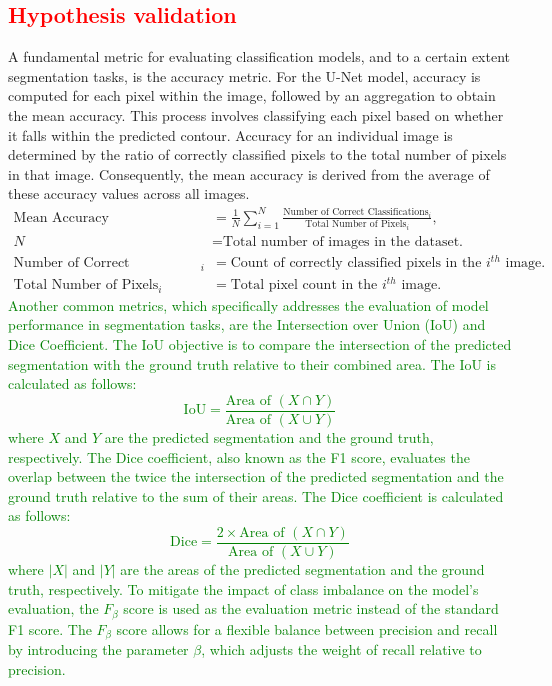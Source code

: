 \documentclass[preprint,12pt]{elsarticle}
\begin{document}
\subsection{\textcolor{red}{Hypothesis validation}}
A fundamental metric for evaluating classification models, and to a certain extent segmentation tasks, is the accuracy metric. For the U-Net model, accuracy is computed for each pixel within the image, followed by an aggregation to obtain the mean accuracy. This process involves classifying each pixel based on whether it falls within the predicted contour. Accuracy for an individual image is determined by the ratio of correctly classified pixels to the total number of pixels in that image. Consequently, the mean accuracy is derived from the average of these accuracy values across all images.
\begin{align*}
\text{Mean Accuracy} & = \frac{1}{N} \sum_{i=1}^{N} \frac{\text{Number of Correct Classifications}_i}{\text{Total Number of Pixels}_i}, \\
N & = \text{Total number of images in the dataset.} \\
\text{Number of Correct Classifications}_i & = \text{Count of correctly classified pixels in the $i^{th}$ image.} \\
\text{Total Number of Pixels}_i & = \text{Total pixel count in the $i^{th}$ image.}
\end{align*}
\textcolor{green}{Another common metrics, which specifically addresses the evaluation of model performance in segmentation tasks, are the Intersection over Union (IoU) and Dice Coefficient.
The IoU objective is to compare the intersection of the predicted segmentation with the ground truth relative to their combined area. The IoU is calculated as follows:
\begin{equation}
\text{IoU} = \frac{\text{Area of } (X \cap Y)}{\text{Area of } (X \cup Y)}
\end{equation}
where $X$ and $Y$ are the predicted segmentation and the ground truth, respectively.
The Dice coefficient, also known as the F1 score, evaluates the overlap between the twice the intersection of the predicted segmentation and the ground truth relative to the sum of their areas. The Dice coefficient is calculated as follows:
\begin{equation}
\text{Dice} = \frac{2 \times \text{Area of } (X \cap Y)}{\text{Area of } (X \cup Y)}
\end{equation}
where $|X|$ and $|Y|$ are the areas of the predicted segmentation and the ground truth, respectively.
To mitigate the impact of class imbalance on the model's evaluation, the \( F_{\beta} \) score is used as the evaluation metric instead of the standard F1 score. The \( F_{\beta} \) score allows for a flexible balance between precision and recall by introducing the parameter \(\beta\), which adjusts the weight of recall relative to precision.}
\end{document}

